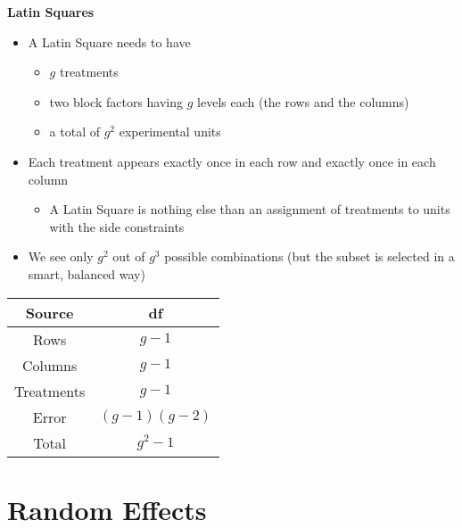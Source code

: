\documentclass[a4paper]{article}
\begin{document}
\textbf{Latin Squares}
\begin{itemize}
    \item A Latin Square needs to have
    \begin{itemize}
        \item $g$ treatments
        \item two block factors having $g$ levels each (the rows and the columns)
        \item a total of $g^2$ experimental units
    \end{itemize}
    \item Each treatment appears exactly once in each row and exactly once in each column
    \begin{itemize}
        \item A Latin Square is nothing else than an assignment of treatments to units with the side constraints
    \end{itemize}
    \item We see only $g^2$ out of $g^3$ possible combinations (but the subset is selected in a smart, balanced way)
\end{itemize}
\begin{table}[!htbp]
    \centering
    \begin{tabular}{c|c}
    \textbf{Source} & \textbf{df} \\
    \hline
    Rows & $g-1$ \\
    \hline 
    Columns & $g-1$ \\
    \hline 
    Treatments & $g-1$ \\
    \hline 
    Error & $(g-1)(g-2)$ \\
    \hline
    Total & $g^2-1$
    \end{tabular}
\end{table}


\section{Random Effects}
\end{document}
